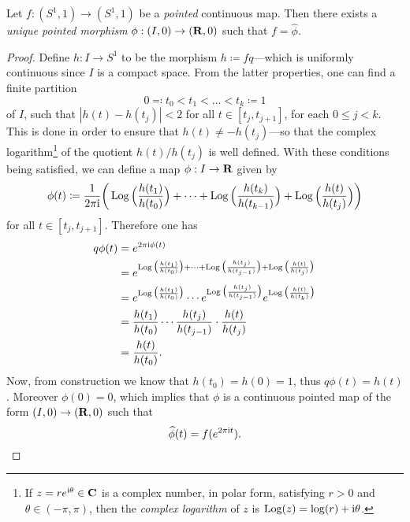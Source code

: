 \begin{proposition}
    \label{prop:unwinding-pointed-maps}
    Let \(f: (S^1, 1) \to (S^1, 1)\) be a \emph{pointed} continuous map. Then there
    exists a \emph{unique pointed morphism} \(\phi: (I, 0) \to (\mathbf{R}, 0)\) such that
    \(f = \widehat \phi\).
\end{proposition}

\begin{proof}
    Define \(h: I \to S^1\) to be the morphism \(h \coloneq f q\)---which is
    uniformly continuous since \(I\) is a compact space. From the latter properties,
    one  can find a finite partition
    \[
        0 \eqqcolon t_0 < t_1 < \dots < t_k \coloneq 1
    \]
    of \(I\), such that \(|h(t) - h(t_j)| < 2\) for all \(t \in [t_j, t_{j+1}]\),
    for each \(0 \leq j < k\). This is done in order to ensure that
    \(h(t) \neq -h(t_j)\)---so that the complex logarithm\footnote{ If
        \(z = r e^{\text{i} \theta} \in \mathbf{C}\) is a complex number, in polar form,
        satisfying \(r > 0\) and \(\theta \in (-\pi, \pi)\), then the \emph{complex
            logarithm} of \(z\) is \(\operatorname{Log}(z) = \log(r) + \text{i} \theta\).
    } of the quotient \(h(t)/h(t_j)\) is
    well defined. With these conditions being satisfied, we can define a map
    \(\phi: I \to \mathbf{R}\) given by
    \[
        \phi(t) \coloneq
        \frac{1}{2 \pi \text{i}} \bigg(
        \operatorname{Log}\Big( \frac{h(t_1)}{h(t_0)} \Big)
        + \dots
        + \operatorname{Log}\Big( \frac{h(t_k)}{h(t_{k-1})} \Big)
        + \operatorname{Log}\Big( \frac{h(t)}{h(t_j)} \Big)
        \bigg)
    \]
    for all \(t \in [t_j, t_{j+1}]\). Therefore one has
    \begin{align*}
        q \phi(t)
         & = e^{2 \pi \text{i} \phi(t)}
        \\
         & = e^{
                \operatorname{Log}\big( \frac{h(t_1)}{h(t_0)} \big)
                + \dots
                + \operatorname{Log}\big( \frac{h(t_j)}{h(t_{j-1})} \big)
                + \operatorname{Log}\big( \frac{h(t)}{h(t_j)} \big)
            }
        \\
         & = e^{\operatorname{Log}\big( \frac{h(t_1)}{h(t_0)} \big)}
        \cdots
        e^{\operatorname{Log}\big( \frac{h(t_j)}{h(t_{j-1})} \big)}
        e^{\operatorname{Log}\big( \frac{h(t)}{h(t_k)} \big)}
        \\
         & = \frac{h(t_{1})}{h(t_0)} \cdots
        \frac{h(t_{j})}{h(t_{j-1})}
        \cdot
        \frac{h(t)}{h(t_j)}
        \\
         & = \frac{h(t)}{h(t_0)}.
    \end{align*}
    Now, from construction we know that \(h(t_0) = h(0) = 1\), thus
    \(q \phi(t) = h(t)\). Moreover \(\phi(0) = 0\), which implies that \(\phi\) is a
    continuous pointed map of the form \((I, 0) \to (\mathbf{R}, 0)\) such that
    \[
        \widehat \phi(t) = f(e^{2 \pi \text{i} t}).
    \]


\end{proof}
